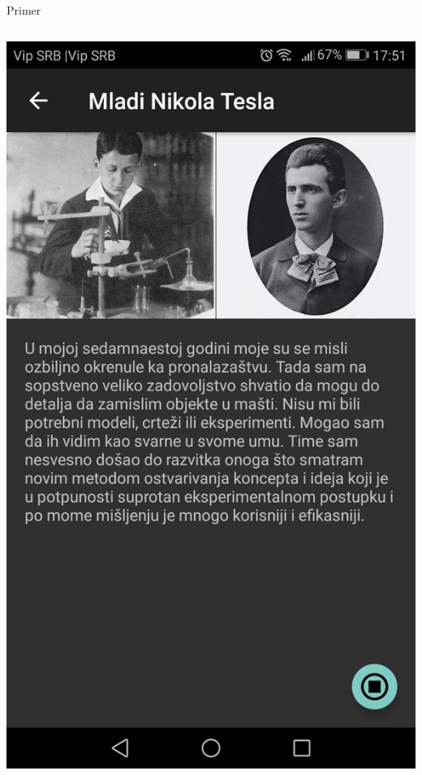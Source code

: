 \documentclass{beamer}
\begin{document}
\begin{frame}{Primer}
\begin{columns}
\begin{column}{0.5\textwidth}
\begin{center}
        \includegraphics[scale=0.093]{./slike/young_tesla_app.png}
    \end{center}
\end{column}
\end{columns}
\end{frame}

\end{document}
